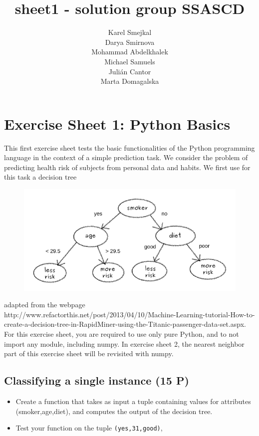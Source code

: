 \documentclass[11pt]{article}
\title{sheet1 - solution group SSASCD}
\author{Karel Smejkal\\
							Darya Smirnova\\
							Mohammad Abdelkhalek\\
							Michael Samuels\\
							Julián Cantor\\
							Marta Domagalska}
\makeatletter
\def\maxwidth{\ifdim\Gin@nat@width>\linewidth\linewidth
    \else\Gin@nat@width\fi}
\let\Oldincludegraphics\includegraphics
\renewcommand{\includegraphics}[1]{\Oldincludegraphics[width=.8\maxwidth]{#1}}
\providecommand{\tightlist}{%
      \setlength{\itemsep}{0pt}\setlength{\parskip}{0pt}}
\makeatother
\begin{document}
    
    
    \maketitle
    
    

    
    \section{Exercise Sheet 1: Python
Basics}\label{exercise-sheet-1-python-basics}

This first exercise sheet tests the basic functionalities of the Python
programming language in the context of a simple prediction task. We
consider the problem of predicting health risk of subjects from personal
data and habits. We first use for this task a decision tree

\begin{figure}
\centering
\includegraphics{tree.png}
\caption{}
\end{figure}

adapted from the webpage
http://www.refactorthis.net/post/2013/04/10/Machine-Learning-tutorial-How-to-create-a-decision-tree-in-RapidMiner-using-the-Titanic-passenger-data-set.aspx.
For this exercise sheet, you are required to use only pure Python, and
to not import any module, including numpy. In exercise sheet 2, the
nearest neighbor part of this exercise sheet will be revisited with
numpy.

    \subsection{Classifying a single instance (15
P)}\label{classifying-a-single-instance-15-p}

\begin{itemize}
\tightlist
\item
  Create a function that takes as input a tuple containing values for
  attributes (smoker,age,diet), and computes the output of the decision
  tree.
\item
  Test your function on the tuple
  \texttt{(\textquotesingle{}yes\textquotesingle{},31,\textquotesingle{}good\textquotesingle{})},
\end{itemize}
\end{document}
